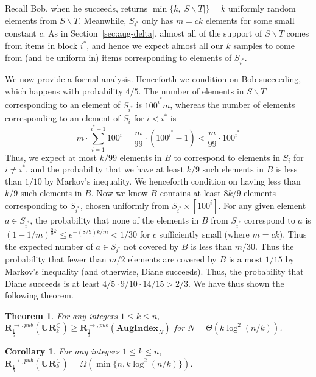 \documentclass[11pt]{article}
\newtheorem{theorem}{Theorem}
\newtheorem{corollary}{Corollary}
\newcommand{\aug}{\mathbf{AugIndex}\xspace}
\newcommand{\ur}{\mathbf{UR}\xspace}
\newcommand{\randcom}{\mathbf{R}}
\begin{document}
Recall Bob, when he succeeds, returns $\min\{k, |S\backslash T|\} = k$ uniformly random elements from $S\backslash T$. Meanwhile, $S_{i^*}$ only has $m = ck$ elements for some small constant $c$. As in Section~\ref{sec:aug-delta}, almost all of the support of $S\backslash T$ comes from items in block $i^*$, and hence we expect almost all our $k$ samples to come from (and be uniform in) items corresponding to elements of $S_{i^*}$. 

We now provide a formal analysis. Henceforth we condition on Bob succeeding, which happens with probability $4/5$. The number of elements in $S\backslash T$ corresponding to an element of $S_{i^*}$ is $100^{i^*} m$, whereas the number of elements corresponding to an element of $S_i$ for $i < i^*$ is
$$
m\cdot \sum_{i=1}^{i^*-1} 100^i = \frac m{99}\cdot (100^{i^*} - 1) < \frac m{99}\cdot 100^{i^*}
$$
Thus, we expect at most $k/99$ elements in $B$ to correspond to elements in $S_i$ for $i\neq i^*$, and the probability that we have at least $k/9$ such elements in $B$ is less than $1/10$ by Markov's inequality. We henceforth condition on having less than $k/9$ such elements in $B$. Now we know $B$ contains at least $8k/9$ elements corresponding to $S_{i^*}$, chosen uniformly from $S_{i^*}\times [100^i]$. For any given element $a\in S_{i^*}$, the probability that none of the elements in $B$ from $S_{i^*}$ correspond to $a$ is $(1 - 1/m)^{\frac 89 k} \le e^{-(8/9)k/m} < 1/30$ for $c$ sufficiently small (where $m = ck$). Thus the expected number of $a\in S_{i^*}$ not covered by $B$ is less than $m/30$. Thus the probability that fewer than $m/2$ elements are covered by $B$ is a most $1/15$ by Markov's inequality (and otherwise, Diane succeeds). Thus, the probability that Diane succeeds is at least $4/5\cdot 9/10 \cdot 14/15 > 2/3$. We have thus shown the following theorem.

\begin{theorem}
For any integers $1\le k \le n$, $\randcom^{\rightarrow,pub}_{\frac 15}(\ur_k^\subset) \ge \randcom^{\rightarrow,pub}_{\frac 13}(\aug_N)$ for $N = \Theta(k\log^2(n/k))$.
\end{theorem}

\begin{corollary}
For any integers $1\le k \le n$, $\randcom^{\rightarrow,pub}_{\frac 15}(\ur_k^\subset) = \Omega(\min\{n, k\log^2(n/k)\})$.
\end{corollary}
\end{document}
